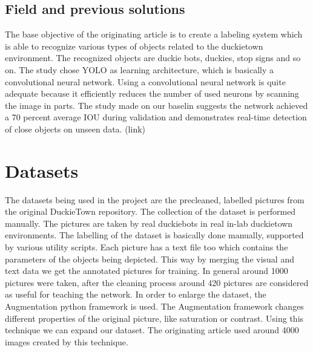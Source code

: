 \documentclass{article}
\begin{document}
\subsection{Field and previous solutions}
The base objective of the originating article is to create a labeling system which is able to recognize various types of objects related to the duckietown environment. The recognized objects are duckie bots, duckies, stop signs and so on. The study chose YOLO as learning architecture, which is basically a convolutional neural network. Using a convolutional neural network is quite adequate because it efficiently reduces the number of used neurons by scanning the image in parts. The study made on our baselin suggests the network achieved a 70 percent average IOU during validation and demonstrates real-time detection of close objects on unseen data. (link)

\section{Datasets}

The datasets being used in the project are the precleaned, labelled pictures from the original DuckieTown repository. The collection of the dataset is performed manually. The pictures are taken by real duckiebots in real in-lab duckietown environments. The labelling of the dataset is basically done manually, supported by various utility scripts. Each picture has a text file too which contains the parameters of the objects being depicted. This way by merging the visual and text data we get the annotated pictures for training. In general around 1000 pictures were taken, after the cleaning process around 420 pictures are considered as useful for teaching the network. In order to enlarge the dataset, the Augmentation python framework is used. The Augmentation framework changes different properties of the original picture, like saturation or contrast. Using this technique we can expand our dataset. The originating article used around 4000 images created by this technique.
\end{document}
